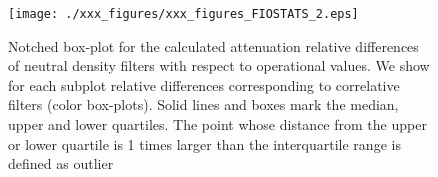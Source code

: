 \begin{figure}[hbtp!]
\begin{center}
\texttt{[image: ./xxx\_figures/xxx\_figures\_FIOSTATS\_2.eps]}
         \caption{Notched box-plot for the calculated attenuation relative differences of neutral density filters with respect to operational values. We show for each subplot relative differences corresponding to correlative filters (color box-plots). Solid lines and boxes mark the median, upper and lower quartiles. The point whose distance from the upper or lower quartile is 1 times larger than the interquartile range is defined as outlier}
         \label{fig:FIOSTATS}
\end{center}
\end{figure}
%
%
%
